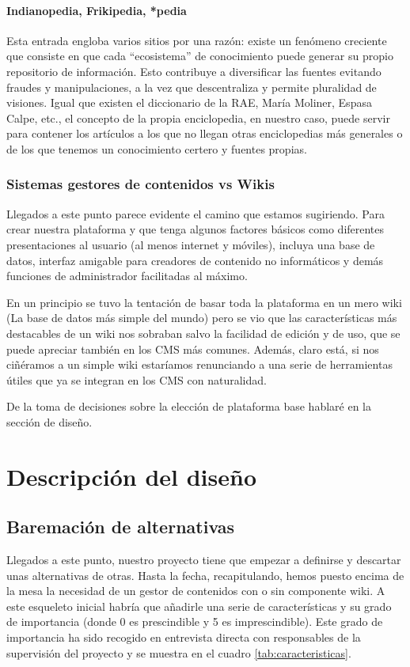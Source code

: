 \paragraph{Indianopedia, Frikipedia, *pedia}
\par Esta entrada engloba varios sitios por una razón: existe un fenómeno creciente que consiste en que cada ``ecosistema'' de conocimiento puede generar su propio repositorio de información. Esto contribuye a diversificar las fuentes evitando fraudes y manipulaciones, a la vez que descentraliza y permite pluralidad de visiones. Igual que existen el diccionario de la RAE, María Moliner, Espasa Calpe, etc., el concepto de la propia enciclopedia, en nuestro caso, puede servir para contener los artículos a los que no llegan otras enciclopedias más generales o de los que tenemos un conocimiento certero y fuentes propias.

\subsubsection{Sistemas gestores de contenidos vs Wikis}
\par Llegados a este punto parece evidente el camino que estamos sugiriendo. Para crear nuestra plataforma y que tenga algunos factores básicos como diferentes presentaciones al usuario (al menos internet y móviles), incluya una base de datos, interfaz amigable para creadores de contenido no informáticos y demás funciones de administrador facilitadas al máximo.

En un principio se tuvo la tentación de basar toda la plataforma en un mero wiki (La base de datos más simple del mundo) pero se vio que las características más destacables de un wiki nos sobraban salvo la facilidad de edición y de uso, que se puede apreciar también en los CMS más comunes. Además, claro está, si nos ciñéramos a un simple wiki estaríamos renunciando a una serie de herramientas útiles que ya se integran en los CMS con naturalidad.

De la toma de decisiones sobre la elección de plataforma base hablaré en la sección de diseño.


\section{Descripción del diseño}

\subsection{Baremación de alternativas}
\par Llegados a este punto, nuestro proyecto tiene que empezar a definirse y descartar unas alternativas de otras. Hasta la fecha, recapitulando, hemos puesto encima de la mesa la necesidad de un gestor de contenidos con o sin componente wiki. A este esqueleto inicial habría que añadirle una serie de características y su grado de importancia (donde 0 es prescindible y 5 es imprescindible). Este grado de importancia ha sido recogido en entrevista directa con responsables de la supervisión del proyecto y se muestra en el cuadro \ref{tab:caracteristicas}.

